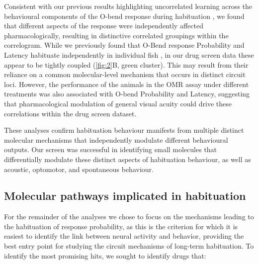\documentclass[9pt,lineno]{RandlettLab_elife}
\begin{document}
Consistent with our previous results highlighting uncorrelated learning across the behavioural components of the O-bend response during habituation \cite{Randlett2019-fi}, we found that different aspects of the response were independently affected pharmacologically, resulting in distinctive correlated groupings within the correlogram. While we previously found that O-Bend response Probability and Latency habituate independently in individual fish \cite{Randlett2019-fi}, in our drug screen data these appear to be tightly coupled (\autoref{fig:2}B, green cluster). This may result from their reliance on a common molecular-level mechanism that occurs in distinct circuit loci. However, the performance of the animals in the OMR assay under different treatments was also associated with O-bend Probability and Latency, suggesting that pharmacological modulation of general visual acuity could drive these correlations within the drug screen dataset.

These analyses confirm habituation behaviour manifests from multiple distinct molecular mechanisms that independently modulate different behavioural outputs. Our screen was successful in identifying small molecules that differentially modulate these distinct aspects of habituation behaviour, as well as acoustic, optomotor, and spontaneous behaviour. 

\subsection{Molecular pathways implicated in habituation}

For the remainder of the analyses we chose to focus on the mechanisms leading to the habituation of response probability, as this is the criterion for which it is easiest to identify the link between neural activity and behavior, providing the best entry point for studying the circuit mechanisms of long-term habituation. To identify the most promising hits, we sought to identify drugs that:
\end{document}
